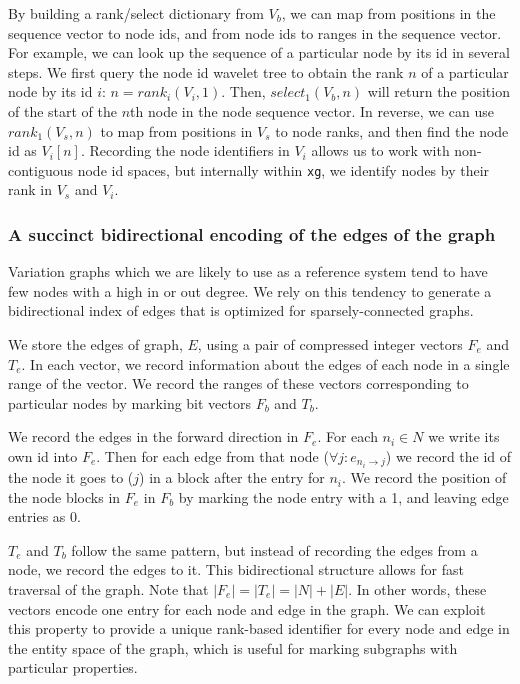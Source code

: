 \documentclass{article}
\begin{document}
By building a rank/select dictionary from $V_b$, we can map from positions in the sequence vector to node ids, and from node ids to ranges in the sequence vector.
For example, we can look up the sequence of a particular node by its id in several steps.
We first query the node id wavelet tree to obtain the rank $n$ of a particular node by its id $i$: $n = rank_{i}(V_i, 1)$.
Then, $select_1(V_b, n)$ will return the position of the start of the $n$th node in the node sequence vector.
In reverse, we can use $rank_1(V_s, n)$ to map from positions in $V_s$ to node ranks, and then find the node id as $V_i[n]$.
Recording the node identifiers in $V_i$ allows us to work with non-contiguous node id spaces, but internally within {\tt xg}, we identify nodes by their rank in $V_s$ and $V_i$.

\subsubsection{A succinct bidirectional encoding of the edges of the graph}

Variation graphs which we are likely to use as a reference system tend to have few nodes with a high in or out degree.
We rely on this tendency to generate a bidirectional index of edges that is optimized for sparsely-connected graphs.

We store the edges of graph, $E$, using a pair of compressed integer vectors $F_e$ and $T_e$.
In each vector, we record information about the edges of each node in a single range of the vector.
We record the ranges of these vectors corresponding to particular nodes by marking bit vectors $F_b$ and $T_b$.

We record the edges in the forward direction in $F_e$.
For each $n_i \in N$ we write its own id into $F_e$.
Then for each edge from that node ($\forall j : e_{n_i \rightarrow j}$) we record the id of the node it goes to ($j$) in a block after the entry for $n_i$.
We record the position of the node blocks in $F_e$ in $F_b$ by marking the node entry with a 1, and leaving edge entries as 0.

$T_e$ and $T_b$ follow the same pattern, but instead of recording the edges from a node, we record the edges to it.
This bidirectional structure allows for fast traversal of the graph.
Note that $|F_e| = |T_e| = |N| + |E|$.
In other words, these vectors encode one entry for each node and edge in the graph.
We can exploit this property to provide a unique rank-based identifier for every node and edge in the entity space of the graph, which is useful for marking subgraphs with particular properties.
\end{document}
